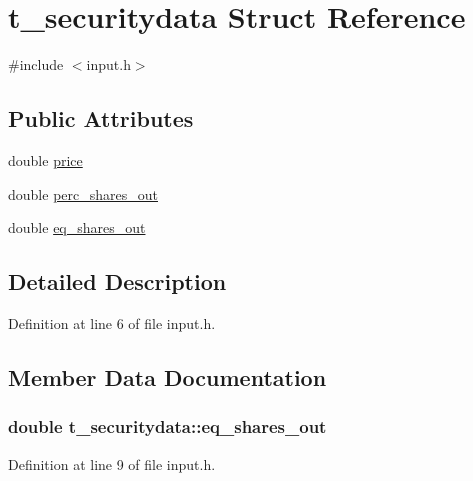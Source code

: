 \hypertarget{structt__securitydata}{}\section{t\+\_\+securitydata Struct Reference}
\label{structt__securitydata}


{\ttfamily \#include $<$input.\+h$>$}

\subsection*{Public Attributes}
\begin{DoxyCompactItemize}
\item 
double \hyperlink{structt__securitydata_afac1f6cd3e3186f5db6dd9ae5fc5afb6}{price}
\item 
double \hyperlink{structt__securitydata_adb0f9c31e35cce915edc83683ef2111d}{perc\+\_\+shares\+\_\+out}
\item 
double \hyperlink{structt__securitydata_ab586a22f27931dea6cb6bf2fd394a5d9}{eq\+\_\+shares\+\_\+out}
\end{DoxyCompactItemize}


\subsection{Detailed Description}


Definition at line 6 of file input.\+h.



\subsection{Member Data Documentation}
\subsubsection[{\texorpdfstring{eq\+\_\+shares\+\_\+out}{eq_shares_out}}]{\setlength{\rightskip}{0pt plus 5cm}double t\+\_\+securitydata\+::eq\+\_\+shares\+\_\+out}\hypertarget{structt__securitydata_ab586a22f27931dea6cb6bf2fd394a5d9}{}\label{structt__securitydata_ab586a22f27931dea6cb6bf2fd394a5d9}


Definition at line 9 of file input.\+h.

